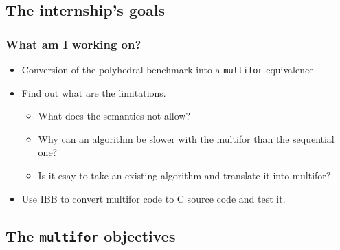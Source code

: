 \documentclass{beamer}
\begin{document}
\subsection{The internship's goals}

\begin{frame}
\frametitle{What am I working on?}
\begin{itemize}

\item Conversion of the polyhedral benchmark into a \texttt{multifor} equivalence.
\item Find out what are the limitations.

\begin{itemize}

\item What does the semantics not allow?
\item Why can an algorithm be slower with the multifor than the sequential one?
\item Is it esay to take an existing algorithm and translate it into multifor?

\end{itemize}

\item Use IBB to convert multifor code to C source code and test it.

\end{itemize}
\end{frame}

\subsection{The \texttt{multifor} objectives}
\end{document}
